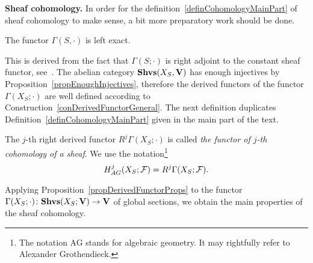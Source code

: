 \textbf{Sheaf cohomology.} In order for the definition~\ref{definCohomologyMainPart} of sheaf cohomology to make sense, a bit more preparatory work should be done.

\begin{prop}\label{propGlobSectLeftExact}
The functor $\Gamma(S,\cdot)$ is left exact.
\end{prop}

This is derived from the fact that $\Gamma(S;\cdot)$ is right adjoint to the constant sheaf functor, see~\cite[\S 2.6]{weibel1994homalg}. The abelian category $\mathbf{Shvs}(X_S,\mathbf{V})$ has enough injectives by Proposition~\ref{propEnoughInjectives}, therefore the derived functors of the functor $\Gamma(X_S;\cdot)$ are well defined according to Construction~\ref{conDerivedFunctorGeneral}. The next definition duplicates Definition~\ref{definCohomologyMainPart} given in the main part of the text.

\begin{defin}\label{definSheafCohomologyDerived}
The $j$-th right derived functor $R^j\Gamma(X_S;\cdot)$ is called \emph{the functor of $j$-th cohomology of a sheaf}. We use the notation\footnote{The notation AG stands for algebraic geometry. It may rightfully refer to Alexander Grothendieck.}
\[
H^j_{AG}(X_S;\mathcal{F})=R^j\Gamma(X_S;\mathcal{F}).
\]
\end{defin}

Applying Proposition~\ref{propDerivedFunctorProps} to the functor $\Gamma(X_S;\cdot)\colon\mathbf{Shvs}(X_S;\mathbf{V})\to\mathbf{V}$ of global sections, we obtain the main properties of the sheaf cohomology.

